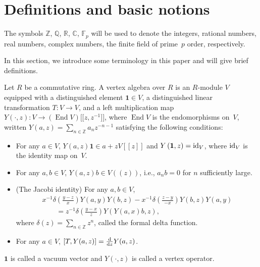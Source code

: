 \documentclass[pdftex]{sigma}%
\numberwithin{equation}{section}
\begin{document}
\section{Definitions and basic notions}\label{section2}
 The symbols $\mathbb{Z}$, $\mathbb{Q}$, $\mathbb{R}$, $\mathbb{C}$, $\mathbb{F}_p$ will be used to denote the integers, rational numbers, real numbers, complex numbers, the finite field of prime~$p$ order, respectively.

 In this section, we introduce some terminology in this paper and will give brief definitions.

\begin{Definition}[\cite{C}]
Let $R$ be a commutative ring. A vertex algebra over $R$ is an $R$-module $V$ equipped with a distinguished element $\mathbf{1}\in V$, a distinguished linear transformation $T\colon V\rightarrow V$, and a left multiplication map
$Y(\cdot,z)\colon V\rightarrow(\operatorname{End} V)\big[\big[z,z^{-1}\big]\big]$, where $\operatorname{End} V$ is the endomorphisms on~$V$, written $Y(a,z)=\sum_{n\in\mathbb{Z}} a_nz^{-n-1}$ satisfying the following conditions:
 \begin{itemize}\itemsep=0pt
 \item For any $a \in V$, $Y(a,z)\mathbf{1}\in a+zV[[z]]$ and $Y\left(\mathbf{1},z\right)={\rm id}_V$, where ${\rm id}_V$ is the identity map on~$V$.
 \item For any $a,b \in V$, $Y(a,z)b\in V((z))$, i.e., $a_nb=0$ for $n$ sufficiently large.
 \item (The Jacobi identity) For any $a,b \in V$,
 \begin{gather*}
x^{-1}\delta \left( \frac{y-z}{x}\right) Y(a,y)Y(b,z)-x^{-1}\delta \left(\frac{z-y}{-x}\right)Y(b,z)Y(a,y)\\
\qquad{} =z^{-1}\delta \left(\frac{y-x}{z}\right)Y(Y(a,x)b,z),
 \end{gather*}
where $\delta (z)=\sum_{n\in \mathbb{Z}}z^n$, called the formal delta function.
 \item For any $a \in V$, $[T,Y(a,z)]=\frac{{\rm d}}{{\rm d}z}Y(a,z)$.
 \end{itemize}
$\mathbf{1}$ is called a vacuum vector and $Y(\cdot,z)$ is called a vertex operator.
\end{Definition}
\end{document}
